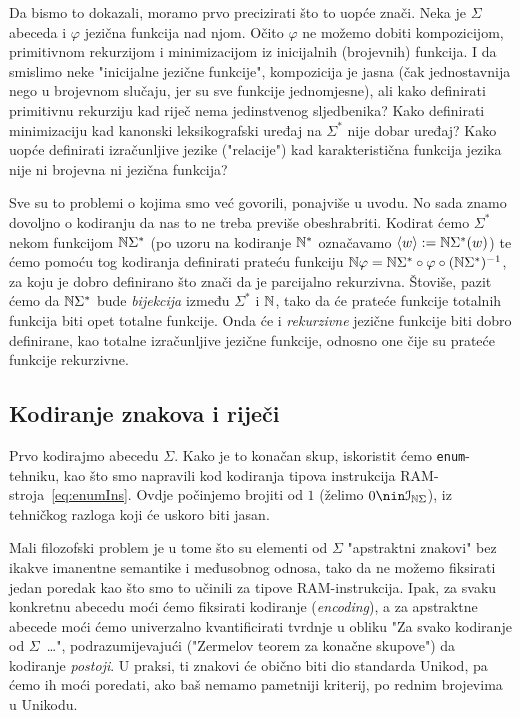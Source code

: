 Da bismo to dokazali, moramo prvo precizirati što to uopće znači. Neka je $\Sigma$ abeceda i $\varphi$ jezična funkcija nad njom. Očito $\varphi$ ne možemo dobiti kompozicijom, primitivnom rekurzijom i minimizacijom iz inicijalnih (brojevnih) funkcija. I da smislimo neke "inicijalne jezične funkcije", kompozicija je jasna (čak jednostavnija nego u brojevnom slučaju, jer su sve funkcije jednomjesne), ali kako definirati primitivnu rekurziju kad riječ nema jedinstvenog sljedbenika? Kako definirati minimizaciju kad kanonski leksikografski uređaj na $\Sigma^*$ nije dobar uređaj? Kako uopće definirati izračunljive jezike ("relacije") kad karakteristična funkcija jezika nije ni brojevna ni jezična funkcija?

Sve su to problemi o kojima smo već govorili, ponajviše u uvodu. No sada znamo dovoljno o kodiranju da nas to ne treba previše obeshrabriti. Kodirat ćemo $\Sigma^*$ nekom funkcijom ${\mathbb N}\Sigma^*$ (po uzoru na kodiranje ${\mathbb N}^*$ označavamo $\langle w\rangle:={\mathbb N}\Sigma^*(w)$) te ćemo pomoću tog kodiranja definirati prateću funkciju ${\mathbb N}\varphi={\mathbb N}\Sigma^*\circ\varphi\circ({\mathbb N}\Sigma^*)^{-1}$, za koju je dobro definirano što znači da je parcijalno rekurzivna.
Štoviše, pazit ćemo da ${\mathbb N}\Sigma^*$ bude \emph{bijekcija} između $\Sigma^*$ i ${\mathbb N}$, tako da će prateće funkcije totalnih funkcija biti opet totalne funkcije. Onda će i \emph{rekurzivne} jezične funkcije biti dobro definirane, kao totalne izračunljive jezične funkcije, odnosno one čije su prateće funkcije rekurzivne.

\subsection{Kodiranje znakova i riječi}\label{sec:kSigma}

Prvo kodirajmo abecedu $\Sigma$. Kako je to konačan skup, iskoristit ćemo \texttt{enum}-tehniku, kao što smo napravili kod kodiranja tipova instrukcija RAM-stroja~\eqref{eq:enumIns}. Ovdje počinjemo brojiti od $1$ (želimo $0\nin\im{\N\Sigma}$), iz tehničkog razloga koji će uskoro biti jasan.

Mali filozofski problem je u tome što su elementi od $\Sigma$ "apstraktni znakovi" bez ikakve imanentne semantike i međusobnog odnosa, tako da ne možemo fiksirati jedan poredak kao što smo to učinili za tipove RAM-instrukcija. Ipak, za svaku konkretnu abecedu moći ćemo fiksirati kodiranje (\emph{encoding}), a za apstraktne abecede moći ćemo univerzalno kvantificirati tvrdnje u obliku "Za svako kodiranje od $\Sigma$~\ldots", podrazumijevajući ("Zermelov teorem za konačne skupove") da kodiranje \emph{postoji}. U praksi, ti znakovi će obično biti dio standarda Unikod, pa ćemo ih moći poredati, ako baš nemamo pametniji kriterij, po rednim brojevima u Unikodu.


